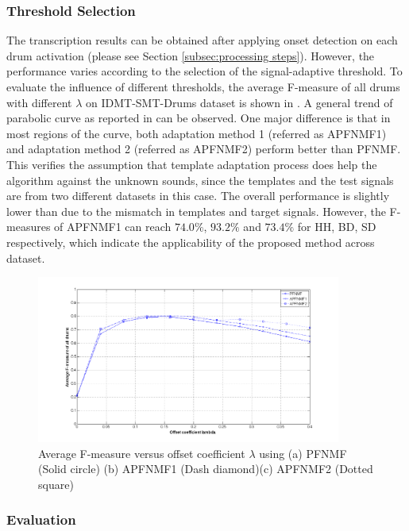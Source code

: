 \documentclass{article}
\begin{document}
\subsubsection{Threshold Selection}\label{subsec:threshold}
The transcription results can be obtained after applying onset detection on each drum activation (please see Section \ref{subsec:processing steps}). However, the performance varies according to the selection of the signal-adaptive threshold. To evaluate the influence of different thresholds, the average F-measure of all drums with different $\lambda$ on IDMT-SMT-Drums dataset is shown in . A general trend of parabolic curve as reported in \cite{Dittmar2014} can be observed. One major difference is that in most regions of the curve, both adaptation method 1 (referred as APFNMF1) and adaptation method 2 (referred as APFNMF2) perform better than PFNMF. This verifies the assumption that template adaptation process does help the algorithm against the unknown sounds, since the templates and the test signals are from two different datasets in this case. The overall performance is slightly lower than \cite{Dittmar2014} due to the mismatch in templates and target signals. However, the F-measures of APFNMF1 can reach $74.0\%$, $93.2\%$ and $73.4\%$ for HH, BD, SD respectively, which indicate the applicability of the proposed method across dataset. 

\begin{figure}
 \centerline{
 \includegraphics[width=10cm]{thresSelect.png}}
 \caption{Average F-measure versus offset coefficient $\lambda$ using (a) PFNMF (Solid circle) (b) APFNMF1 (Dash diamond)(c) APFNMF2 (Dotted square)}%
 \label{fig:thresTest}
\end{figure}

\subsubsection{Evaluation}\label{subsec:Evaluation}
\end{document}
